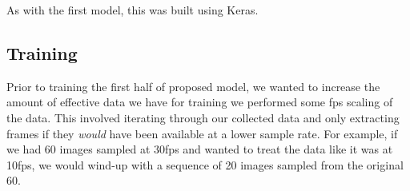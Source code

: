 As with the first model, this was built using Keras.







\subsection{Training}
Prior to training the first half of proposed model, we wanted to increase the amount of effective data we have for training we performed some fps scaling of the data. 
This involved iterating through our collected data and only extracting frames if they \textit{would} have been available at a lower sample rate. 
For example, if we had 60 images sampled at 30fps and wanted to treat the data like it was at 10fps, we would wind-up with a sequence of 20 images sampled from the original 60.

